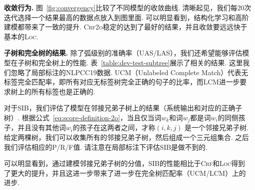 \noindent\textbf{收敛行为.}
图~\ref{fig:convergency}比较了不同模型的收敛曲线.
清晰起见，我们每20次迭代选择一个结果最高的数据点放入到图里面.
可以明显看到，结构化学习和高阶建模都带来了一致的提升.
\textsc{Crf2o}稳定的达到了最好的结果，并且收敛要远远快于基本的\textsc{Loc}.



\noindent\textbf{子树和完全树的结果.}
除了弧级别的准确率（UAS/LAS），我们还希望能够评估模型在子树和完全树上的性能.
表~\ref{table:dev-test-subtree}展示了相关的结果.
这里我们忽略了局部标注的NLPCC19数据.
UCM（Unlabeled Complete Match）代表无标签完全匹配率，即所有对应无标签树完全正确的句子的比率，而LCM进一步要求树上的所有标签也是正确的.

对于SIB，我们评估了模型在邻接兄弟子树上的结果（系统输出和对应的正确子树）.
根据公式~\ref{eq:score-definition-2o}，当且仅当词$w_k$和词$w_j$都是词$w_i$的同侧孩子，并且没有其他词$w_i$的孩子在这两者之间，才称$(i,k,j)$ 是一个邻接兄弟子树.
给定两棵树，我们可以收集所有的邻接兄弟子树，然后组成一个三元组集合.
之后我们评估相应的P/R/F值.
请注意在局部标注下评估SIB是做不到的.

可以明显看到，通过建模邻接兄弟子树的分值，SIB的性能相比于\textsc{Crf}和\textsc{Loc}得到了更大的提升，并且这进一步带来了进一步在完全树匹配率（UCM/LCM）上的进步.

